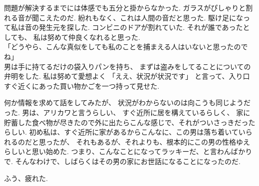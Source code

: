 問題が解決するまでには体感でも五分と掛からなかった.
ガラスがぴしゃりと割れる音が聞こえたのだ.
紛れもなく、これは人間の音だと思った.
駆け足になって私は音の発生元を探した.
コンビニのドアが割れていた.
それが誰であったとしても、
私は努めて仲良くなれると思った.\\
「どうやら、こんな真似をしても私のことを捕まえる人はいないと思ったのでね」\\
男は手に持てるだけの袋入りパンを持ち、
まずは盗みをしてることについての弁明をした.
私は努めて愛想よく
「ええ、状況が状況です」
と言って、入り口すぐ近くにあった買い物かごを一つ持って見せた.

何か情報を求めて話をしてみたが、
状況がわからないのは向こうも同じようだった.
男は、アリカワと言うらしい、
すぐ近所に居を構えているらしく、
家に貯蓄した食べ物が尽きたので外に出たらこんな感じで、それがついさっきだったらしい.
初め私は、すぐ近所に家があるからこんなに、この男は落ち着いていられるのだと思ったが、
それもあるが、それよりも、根本的にこの男の性格ゆえらしいと思い始めた.
つまり、こんなことになってラッキーだ、と言わんばかりで.
そんなわけで、しばらくはその男の家にお世話になることになったのだ.

ふう、疲れた.

